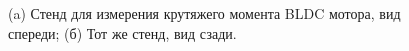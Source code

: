 \begin{figure}[ht]
\begin{subfigure}[b]{0.45\textwidth}
        \caption{}
    \end{subfigure}
     
    \caption{(a) Стенд для измерения крутяжего момента BLDC мотора, вид спереди; (б) Тот же стенд, вид сзади.}
    \label{fig_bldc_test_drawings}
\end{figure}